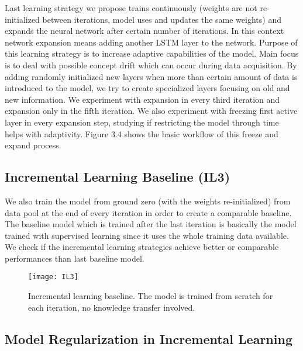 Last learning strategy we propose trains continuously (weights are not re-initialized between iterations, model uses and updates the same weights) and expands the neural network after certain number of iterations. In this context network expansion means adding another LSTM layer to the network. Purpose of this learning strategy is to increase adaptive capabilities of the model. Main focus is to deal with possible concept drift which can occur during data acquisition. By adding randomly initialized new layers when more than certain amount of data is introduced to the model, we try to create specialized layers focusing on old and new information. We experiment with expansion in every third iteration and expansion only in the fifth iteration. We also experiment with freezing first active layer in every expansion step, studying if restricting the model through time helps with adaptivity. Figure 3.4 shows the basic workflow of this freeze and expand process.  

\subsection{Incremental Learning Baseline (IL3)}

We also train the model from ground zero (with the weights re-initialized) from data pool at the end of every iteration in order to create a comparable baseline. The baseline model which is trained after the last iteration is basically the model trained with supervised learning since it uses the whole training data available. We check if the incremental learning strategies achieve better or comparable performances than last baseline model.

\begin{figure}[t]
\texttt{[image: IL3]}
\centering
\caption{Incremental learning baseline. The model is trained from scratch for each iteration, no knowledge transfer involved.}
\end{figure}

\subsection{Model Regularization in Incremental Learning}

